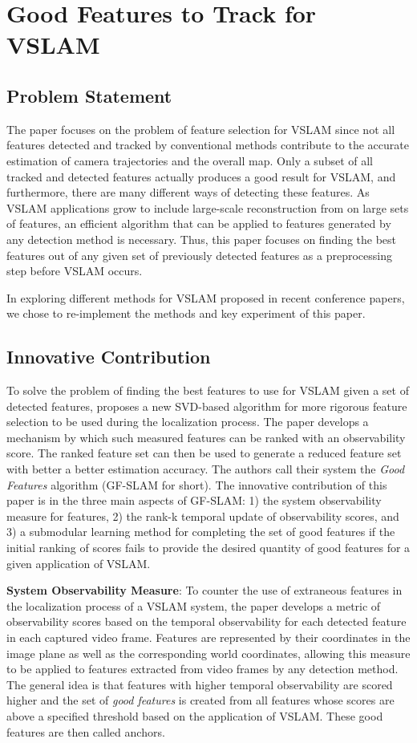 \documentclass[10pt,twocolumn,letterpaper]{article}
\begin{document}
\section {Good Features to Track for VSLAM}
\subsection{Problem Statement}
The paper \cite{Zhang_2015_CVPR} focuses on the problem of feature selection for VSLAM since not all features 
detected and tracked by conventional methods contribute to the accurate estimation of 
camera trajectories and the overall map. Only a subset of all tracked and detected features 
actually produces a good result for VSLAM, and furthermore, there are many different ways of
detecting these features. As VSLAM applications grow to include large-scale reconstruction from 
on large sets of features, an efficient algorithm that can be applied to features generated by any 
detection method is necessary. Thus, this paper focuses on finding the best features out of any given 
set of previously detected features as a preprocessing step before VSLAM occurs.

In exploring different methods for VSLAM proposed in recent conference papers, 
we chose to re-implement the methods and key experiment of this paper.

\subsection{Innovative Contribution}
To solve the problem of finding the best features to use for VSLAM given a set of detected features, 
\cite{Zhang_2015_CVPR} proposes a new SVD-based algorithm for more rigorous feature selection to be used 
during the localization process. The paper develops a mechanism by which such measured features 
can be ranked with an observability score. The ranked feature set can then be used to generate a 
reduced feature set with better a better estimation accuracy. The authors call their system the \textit{Good 
Features} algorithm (GF-SLAM for short). The innovative contribution of this paper is in the three main 
aspects of GF-SLAM: 1) the system observability measure for features, 2) the rank-k temporal update 
of observability scores, and 3) a submodular learning method for completing the set of good features if 
the initial ranking of scores fails to provide the desired quantity of good features for a given application of 
VSLAM.

\textbf{System Observability Measure}: To counter the use of extraneous features in the localization process 
of a VSLAM system, the paper develops a metric of observability scores based on the temporal observability 
for each detected feature in each captured video frame. Features are represented by their coordinates in the 
image plane as well as the corresponding world coordinates, allowing this measure to be applied to features 
extracted from video frames by any detection method. The general idea is that features with higher temporal 
observability are scored higher and the set of \textit{good features} is created from all features whose scores are 
above a specified threshold based on the application of VSLAM. These good features are then called 
anchors.
\end{document}
